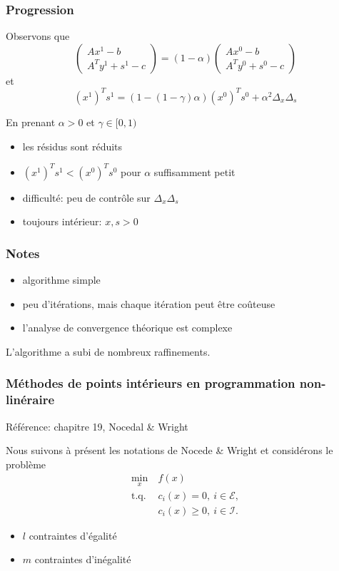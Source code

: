 \documentclass[usepdftitle=false]{beamer}
\def\cE{\mathcal{E}}
\def\cI{\mathcal{I}}
\begin{document}
\begin{frame}
\frametitle{Progression}

Observons que
$$
\begin{pmatrix}
Ax^1 - b \\ A^Ty^1 + s^1 - c
\end{pmatrix}
=
(1 - \alpha)
\begin{pmatrix}
Ax^0 - b \\ A^Ty^0 + s^0 - c
\end{pmatrix}
$$
et
$$
(x^1)^T s^1 = (1-(1-\gamma)\alpha)(x^0)^Ts^0+\alpha^2\Delta_x \Delta_s
$$

\mbox{}

En prenant $\alpha > 0$ et $\gamma \in [0,1)$
\begin{itemize}
	\item les résidus sont réduits
	\item $(x^1)^Ts^1 < (x^0)^Ts^0$ pour $\alpha$ suffisamment petit
	\item difficulté: peu de contrôle sur $\Delta_x \Delta_s$
	\item toujours intérieur: $x, s > 0$
\end{itemize}

\end{frame}

\begin{frame}
\frametitle{Notes}

\begin{itemize}
	\item algorithme simple
	\item peu d'itérations, mais chaque itération peut être coûteuse
	\item l'analyse de convergence théorique est complexe
\end{itemize}

\mbox{}

L'algorithme a subi de nombreux raffinements.

\end{frame}

\begin{frame}
\frametitle{Méthodes de points intérieurs en programmation non-linéraire}

Référence: chapitre 19, Nocedal \& Wright

\mbox{}

Nous suivons à présent les notations de Nocede \& Wright et considérons le problème
\begin{align*}
\min_x \ & f(x) \\
\mbox{t.q. } & c_i(x) = 0,\ i \in \cE, \\
& c_i(x) \geq 0,\ i \in \cI.
\end{align*}
\begin{itemize}
	\item $l$ contraintes d'égalité
	\item $m$ contraintes d'inégalité
\end{itemize}

\end{frame}
\end{document}
